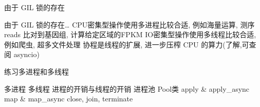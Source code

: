 \begin{frame}{由于 GIL 锁的存在}
    \begin{myoutline}
        \1 由于 GIL 锁的存在\dots
        \2 CPU密集型操作使用多进程比较合适, 例如海量运算, 测序 reads 比对到基因组, 计算给定区域的FPKM
        \2 IO密集型操作使用多线程比较合适, 例如爬虫, 超多文件处理
        \2 协程是线程的扩展, 进一步压榨 CPU 的算力(了解,可查阅 asyncio)
    \end{myoutline}
\end{frame}

\begin{frame}[standout]{练习多进程和多线程}
    \begin{myoutline}
        \1 多进程
        \1 多线程
        \1 进程的开销与线程的开销
        \1 进程池 Pool类
            \2 apply \& apply\_async
            \2 map \& map\_async
            \2 close, join, terminate
    \end{myoutline}
\end{frame}



